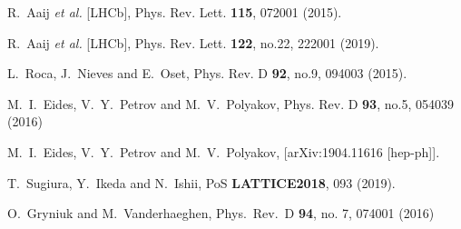 \documentclass[prd,amsmath,%
twocolumn,floatfix,amssymb, preprintnumbers, linenumbers,nofootinbib, superscriptaddress]{revtex4}
\begin{document}
\begin{thebibliography}{99}
R.~Aaij \textit{et al.} [LHCb],
Phys. Rev. Lett. \textbf{115}, 072001 (2015). 


R.~Aaij \textit{et al.} [LHCb],
Phys. Rev. Lett. \textbf{122}, no.22, 222001 (2019). 


L.~Roca, J.~Nieves and E.~Oset,
Phys. Rev. D \textbf{92}, no.9, 094003 (2015). 


M.~I.~Eides, V.~Y.~Petrov and M.~V.~Polyakov,
Phys. Rev. D \textbf{93}, no.5, 054039 (2016)


M.~I.~Eides, V.~Y.~Petrov and M.~V.~Polyakov,
[arXiv:1904.11616 [hep-ph]].


T.~Sugiura, Y.~Ikeda and N.~Ishii,
PoS \textbf{LATTICE2018}, 093 (2019). 







  O.~Gryniuk and M.~Vanderhaeghen,
  Phys.\ Rev.\ D {\bf 94}, no. 7, 074001 (2016)


\end{thebibliography}
\end{document}
